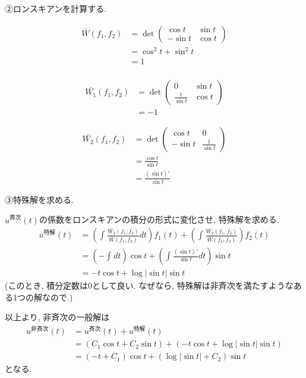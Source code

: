 \documentclass[a4paper,12pt]{jlreq}
\begin{document}
②ロンスキアンを計算する.\par

\begin{align*}
    \bar{W}(f_1,f_2) &= \det 
\begin{pmatrix}
        \cos t & \sin t \\
        -\sin t & \cos t
\end{pmatrix}\\
&= \cos^2 t + \sin^2 t\\
&= 1\\
\end{align*}


\begin{align*}
    \bar{W_1}(f_1,f_2) &= \det
    \begin{pmatrix}
        0 & \sin t \\
        \frac{1}{\sin t} & \cos t
    \end{pmatrix}\\
&= -1
\end{align*}


\begin{align*}
    \bar{W_2}(f_1,f_2) &= \det
    \begin{pmatrix}
        \cos t & 0 \\
        -\sin t & \frac{1}{\sin t}
    \end{pmatrix} \\
&= \frac{\cos t}{\sin t} \\
&= \frac{(\sin t)'}{\sin t}
\end{align*}

③特殊解を求める.\par

$u^{\text{斉次}}(t)$の係数をロンスキアンの積分の形式に変化させ, 
特殊解を求める. 
\begin{align*}
    u^{特解}(t) &= \left( \int_{}^{} \frac{\bar{W_2}(f_1,f_2)}{\bar{W}(f_1,f_2)}dt\right)f_1(t) + \left( \int_{}^{} \frac{\bar{W_2}(f_1,f_2)}{\bar{W}(f_1,f_2)}\right) f_2(t)\\
               &= \left(-\int_{}^{} dt \right)\cos t + \left(\int \frac{(\sin t)'}{\sin t} dt\right) \sin t \\
               &= -t \cos t + \log|\sin t|\sin t
\end{align*}
(このとき, 積分定数は0として良い. 
なぜなら, 特殊解は非斉次を満たすようなある1つの解なので.)

以上より, 非斉次の一般解は
\begin{align*}
    u^{非斉次}(t) &= u^{斉次}(t) + u^{特解}(t) \\
                &= \left(C_1 \cos t + C_2 \sin t\right) + \left(-t\cos t + \log |\sin t|\sin t\right)\\
                &= (-t + C_1) \cos t + \left(\log |\sin t| + C_2\right) \sin t
\end{align*}
となる.
\end{document}
